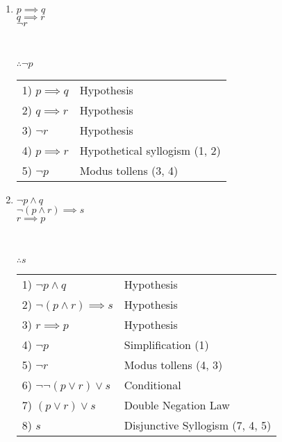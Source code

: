 \documentclass[a4paper]{article}
\begin{document}
\begin{enumerate}
\boldmath
    \item  $p \implies q$ \\
    $q \implies r$ \\
    $\neg r$ \\
    \begin{tabularx}{0.1\textwidth}{X}
        \hline
    \end{tabularx}\\
    $\therefore \neg p$
\unboldmath
\smallskip

\begin{tabularx}{0.6\textwidth}{X X}
\toprule
1) $p \implies q$ & Hypothesis\\
2) $q \implies r$ & Hypothesis\\
3) $\neg r$ & Hypothesis\\
4) $p \implies r$ & Hypothetical syllogism (1, 2)\\
5) $\neg p$ & Modus tollens (3, 4)\\
\end{tabularx}

\boldmath
    \item $\neg p \land q$ \\
    $\neg(p \land r) \implies s$ \\
    $r \implies p$ \\
    \begin{tabularx}{0.1\textwidth}{X}
        \hline
    \end{tabularx}\\
    $\therefore s$
\unboldmath

\smallskip

\begin{tabularx}{0.6\textwidth}{X X}
\toprule
1) $\neg p \land q$ & Hypothesis\\
2) $\neg(p \land r) \implies s$ & Hypothesis\\
3) $r \implies p$ & Hypothesis\\
4) $\neg p$ & Simplification (1) \\
5) $\neg r$ & Modus tollens (4, 3) \\
6) $\neg \neg(p \lor r) \lor s$ & Conditional \\
7) $(p \lor r) \lor s$ & Double Negation Law \\
8) $s$ & Disjunctive Syllogism (7, 4, 5)
\end{tabularx}
\end{enumerate}
\end{document}
